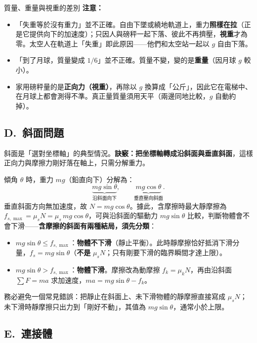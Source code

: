 \documentclass[11pt]{article}
\begin{document}
\begin{補充框}{質量、重量與視重的差別}
\textbf{注意：}
\begin{itemize}\setlength{\itemsep}{1pt}
\item 「失重等於沒有重力」並不正確。自由下墜或繞地軌道上，重力\textbf{照樣在拉}（正是它提供向下的加速度）；只因人與磅秤一起下落、彼此不再擠壓，\textbf{視重}才為零。太空人在軌道上「失重」即此原因——他們和太空站一起以 $g$ 自由下落。
\item 「到了月球，質量變成 $1/6$」並不正確。質量不變，變的是\textbf{重量}（因月球 $g$ 較小）。
\item 家用磅秤量的是\textbf{正向力（視重）}，再除以 $g$ 換算成「公斤」，因此它在電梯中、在月球上都會測得不準。真正量質量須用天平（兩邊同地比較，$g$ 自動約掉）。
\end{itemize}
\end{補充框}

\subsection*{\sffamily D.\ 斜面問題}

斜面是「選對坐標軸」的典型情況。\textbf{訣竅：把坐標軸轉成沿斜面與垂直斜面}，這樣正向力與摩擦力剛好落在軸上，只需分解重力。


傾角 $\theta$ 時，重力 $mg$（鉛直向下）分解為：
$$\underbrace{mg\sin\theta}_{\text{沿斜面向下}},\qquad \underbrace{mg\cos\theta}_{\text{垂直壓向斜面}}.$$
垂直斜面方向無加速度，故 $N = mg\cos\theta$。據此，含摩擦時最大靜摩擦為 $f_{s,\max}=\mu_s N=\mu_s\, mg\cos\theta$，可與沿斜面的驅動力 $mg\sin\theta$ 比較，判斷物體會不會下滑——\textbf{含摩擦的斜面有兩種結局，須先分類}：
\begin{itemize}\setlength{\itemsep}{1pt}
\item $mg\sin\theta \le f_{s,\max}$：\textbf{物體不下滑}（靜止平衡）。此時靜摩擦恰好抵消下滑分量，$f_s=mg\sin\theta$（\textbf{不是} $\mu_s N$；只有剛要下滑的臨界瞬間才達上限）。
\item $mg\sin\theta > f_{s,\max}$：\textbf{物體下滑}。摩擦改為動摩擦 $f_k=\mu_k N$，再由沿斜面 $\sum F=ma$ 求加速度，$ma=mg\sin\theta-f_k$。
\end{itemize}
務必避免一個常見錯誤：把靜止在斜面上、未下滑物體的靜摩擦直接寫成 $\mu_s N$；未下滑時靜摩擦只出力到「剛好不動」，其值為 $mg\sin\theta$，通常小於上限。

\subsection*{\sffamily E.\ 連接體}
\end{document}
